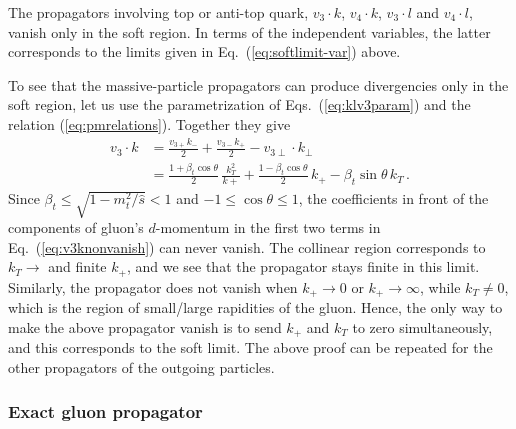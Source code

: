 \documentclass[a4paper,11pt]{article}
\newcommand{\shat}{{\hat s}}
\numberwithin{equation}{section}
\begin{document}
The propagators involving top or anti-top quark, $v_3\cdot k$, $v_4\cdot k$,
$v_3 \cdot l$ and $v_4\cdot l$, vanish only in the soft region.  In terms of the
independent variables, the latter corresponds to the limits given in
Eq.~(\ref{eq:softlimit-var}) above.  

To see that the massive-particle propagators can produce divergencies only in
the soft region, let us use the parametrization of Eqs.~(\ref{eq:klv3param})
and the relation (\ref{eq:pmrelations}). Together they give
%
\begin{align}
  v_{3} \cdot k & =
  \frac{v_{3+} k_-}{2} + \frac{v_{3-} k_+}{2} - v_{3\perp} \cdot k_\perp
  \nonumber \\[0.2em]
  & =
  \frac{1+\beta_t \cos\theta}{2}\, \frac{k_T^2}{k+} + 
  \frac{1-\beta_t \cos\theta}{2}\, k_+ - 
  \beta_t \sin\theta\, k_T\,.
  \label{eq:v3knonvanish}
\end{align}
%
Since $\beta_t \leq \sqrt{1-m_t^2/\shat} < 1$ and $-1 \leq \cos\theta \leq 1$, the
coefficients in front of the components of gluon's $d$-momentum in the first two
terms in Eq.~(\ref{eq:v3knonvanish}) can never vanish. The collinear region
corresponds to $k_T \to $ and finite $k_+$, and we see that the propagator
stays finite in this limit. Similarly, the propagator does not vanish when $k_+
\to 0$ or $k_+ \to \infty$, while $k_T \neq 0$, which is the region of
small/large rapidities of the gluon.  Hence, the only way to make the above
propagator vanish is to send $k_+$ and $k_T$ to zero simultaneously, 
and this corresponds to the soft limit.
%
The above proof can be repeated for the other propagators of the outgoing
particles.


\subsubsection*{Exact gluon propagator}
\end{document}
